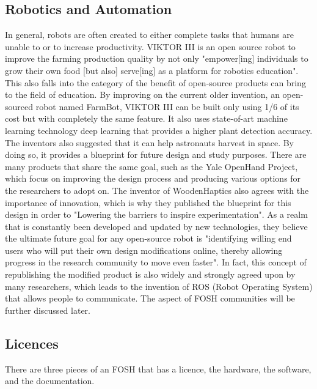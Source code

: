 \documentclass[final-report.tex]{subfiles}
\begin{document}
\subsection{Robotics and Automation}
In general, robots are often created to either complete tasks that humans are unable to or to increase productivity. 
VIKTOR III is an open source robot to improve the farming production quality by not only "empower[ing] individuals to grow their own food [but also] serve[ing] as a platform for robotics education".
This also falls into the category of the benefit of open-source products can bring to the field of education. By improving on the current older invention, an open-sourced robot named FarmBot, VIKTOR III can be built only using 1/6 of its cost but with completely the same feature. 
It also uses state-of-art machine learning technology deep learning that provides a higher plant detection accuracy. 
The inventors also suggested that it can help astronauts harvest in space. 
By doing so, it provides a blueprint for future design and study purposes. 
There are many products that share the same goal, such as the Yale OpenHand Project, which focus on improving the design process and producing various options for the researchers to adopt on. 
The inventor of WoodenHaptics also agrees with the importance of innovation, which is why they published the blueprint for this design in order to "Lowering the barriers to inspire experimentation". 
As a realm that is constantly been developed and updated by new technologies, they believe the ultimate future goal for any open-source robot is "identifying willing end users who will put their own design modifications online, thereby allowing progress in the research community to move even faster". 
In fact, this concept of republishing the modified product is also widely and strongly agreed upon by many researchers, which leads to the invention of ROS\cite{alami2018influencers} (Robot Operating System) that allows people to communicate. 
The aspect of FOSH communities will be further discussed later. 

\subsection{Licences}
There are three pieces of an FOSH that has a licence, the hardware, the software, and the documentation.
\end{document}
